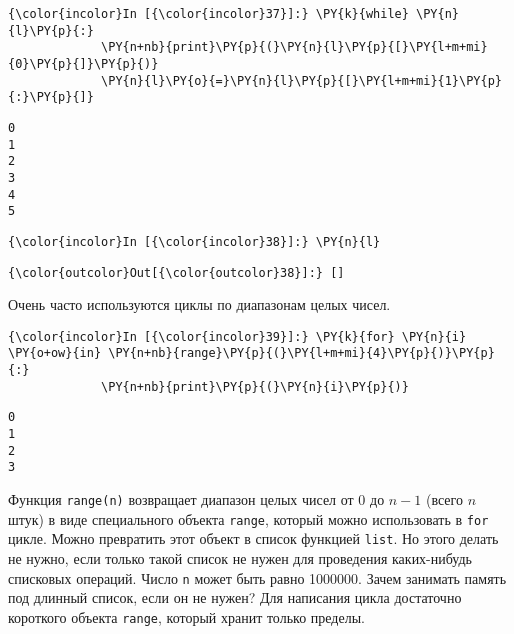     \begin{Verbatim}[commandchars=\\\{\}]
{\color{incolor}In [{\color{incolor}37}]:} \PY{k}{while} \PY{n}{l}\PY{p}{:}
             \PY{n+nb}{print}\PY{p}{(}\PY{n}{l}\PY{p}{[}\PY{l+m+mi}{0}\PY{p}{]}\PY{p}{)}
             \PY{n}{l}\PY{o}{=}\PY{n}{l}\PY{p}{[}\PY{l+m+mi}{1}\PY{p}{:}\PY{p}{]}
\end{Verbatim}

    \begin{Verbatim}[commandchars=\\\{\}]
0
1
2
3
4
5

    \end{Verbatim}

    \begin{Verbatim}[commandchars=\\\{\}]
{\color{incolor}In [{\color{incolor}38}]:} \PY{n}{l}
\end{Verbatim}

            \begin{Verbatim}[commandchars=\\\{\}]
{\color{outcolor}Out[{\color{outcolor}38}]:} []
\end{Verbatim}
        
    Очень часто используются циклы по диапазонам целых чисел.

    \begin{Verbatim}[commandchars=\\\{\}]
{\color{incolor}In [{\color{incolor}39}]:} \PY{k}{for} \PY{n}{i} \PY{o+ow}{in} \PY{n+nb}{range}\PY{p}{(}\PY{l+m+mi}{4}\PY{p}{)}\PY{p}{:}
             \PY{n+nb}{print}\PY{p}{(}\PY{n}{i}\PY{p}{)}
\end{Verbatim}

    \begin{Verbatim}[commandchars=\\\{\}]
0
1
2
3

    \end{Verbatim}

    Функция \texttt{range(n)} возвращает диапазон целых чисел от 0 до
\(n-1\) (всего \(n\) штук) в виде специального объекта \texttt{range},
который можно использовать в \texttt{for} цикле. Можно превратить этот
объект в список функцией \texttt{list}. Но этого делать не нужно, если
только такой список не нужен для проведения каких-нибудь списковых
операций. Число \texttt{n} может быть равно 1000000. Зачем занимать
память под длинный список, если он не нужен? Для написания цикла
достаточно короткого объекта \texttt{range}, который хранит только
пределы.

